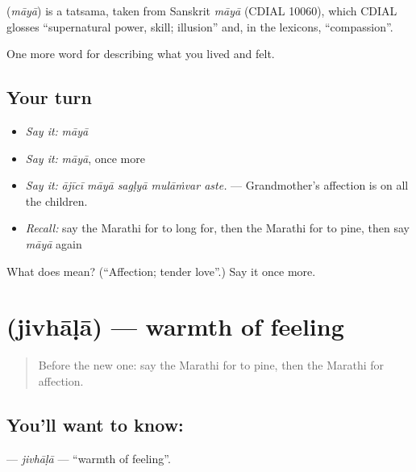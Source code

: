 \begin{cousinweb}
\textbf{} (\emph{māyā}) is a tatsama, taken from Sanskrit \emph{māyā} (CDIAL 10060), which CDIAL glosses \textquotedblleft{}supernatural power, skill; illusion\textquotedblright{} and, in the lexicons, \textquotedblleft{}compassion\textquotedblright{}.
\end{cousinweb}

\begin{grammarlens}[title={What you've built}]
One more word for describing what you lived and felt.
\end{grammarlens}

\subsection*{Your turn}
\begin{itemize}
\raggedright
  \item \emph{Say it:} \emph{māyā}
  \item \emph{Say it:} \emph{māyā}, once more
  \item \emph{Say it:} \emph{ājīcī māyā sagḷyā mulāṁvar aste.} — Grandmother's affection is on all the children.
  \item \emph{Recall:} say the Marathi for to long for, then the Marathi for to pine, then say \emph{māyā} again
\end{itemize}

\begin{tcolorbox}[breakable,colback=teal!4,colframe=teal!35!black,title={Before you move on}]
What does  mean? (\textquotedblleft{}Affection; tender love\textquotedblright{}.) Say it once more.
\end{tcolorbox}
\section[\texorpdfstring{\mr{जिव्हाळा} (jivhāḷā)}{जिव्हाळा (jivhāḷā)}]{ (jivhāḷā) — warmth of feeling}

\label{lesson:MR-C460-jivhala}



\begin{quote}
Before the new one: say the Marathi for to pine, then the Marathi for affection.
\end{quote}

\subsection*{You'll want to know: }
\textbf{} — \emph{jivhāḷā} — \textquotedblleft{}warmth of feeling\textquotedblright{}.

